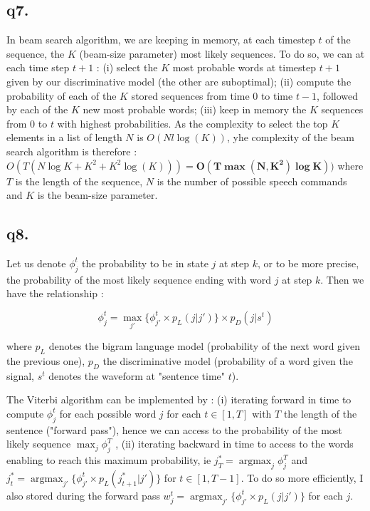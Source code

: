 \documentclass[11pt]{article}
\DeclareMathOperator*{\argmax}{argmax} %
\begin{document}
  
  \subsection*{q7.}
  
  In beam search algorithm, we are keeping in memory, at each timestep $t$ of the sequence, the $K$ (beam-size parameter) most likely sequences. To do so, we can at each time step $t+1$ : (i) select the $K$ most probable words at timestep $t+1$ given by our discriminative model (the other are suboptimal); (ii) compute the probability of each of the $K$ stored sequences from time $0$ to time $t-1$, followed by each of the $K$ new most probable words; (iii) keep in memory the $K$ sequences from $0$ to $t$ with highest probabilities. As the complexity to select the top $K$ elements in a list of length $N$ is $O(Nl \log(K))$, yhe complexity of the beam search algorithm is therefore : $O(T (N \log K + K^2 + K^2 \log(K))) = \mathbf{O(T \max(N, K^2) \log K))}$ where $T$ is the length of the sequence, $N$ is the number of possible speech commands and $K$ is the beam-size parameter.
  
  \subsection*{q8.}
  
  Let us denote $\phi^t_j$ the probability to be in state $j$  at step $k$, or to be more precise, the probability of the most likely sequence ending with word $j$ at step $k$. Then we have the relationship :
  
  $$\phi^t_j = \max_{j'} \{ \phi^t_{j'} \times p_L(j|j') \} \times p_D(j|s^t) $$
   
   where $p_L$ denotes the bigram language model (probability of the next word given the previous one), $p_D$ the discriminative model (probability of a word given the signal, $s^t$ denotes the waveform at "sentence time" $t$).
   
   The Viterbi algorithm can be implemented by : (i) iterating forward in time to compute $\phi^t_j$ for each possible word $j$ for each $t \in [1,T]$ with $T$ the length of the sentence ("forward pass"), hence we can access to the probability of the most likely sequence $\max_j \phi^T_j$ , (ii) iterating backward in time to access to the words enabling to reach this maximum probability, ie $j_T^*=\argmax_j \phi^T_j$ and $j_t^* = \argmax_{j'} \{ \phi^t_{j'} \times p_L(j_{t+1}^*|j') \}$ for $t \in [1,T-1]$. To do so more efficiently, I also stored during the forward pass $w^t_j = \argmax_{j'} \{ \phi^t_{j'} \times p_L(j|j') \}$ for each $j$.
   
\end{document}
